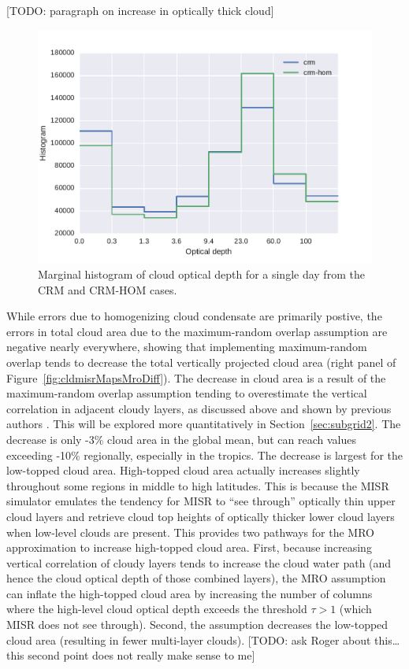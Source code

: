 {[}TODO: paragraph on increase in optically thick cloud{]}

\begin{figure}[htbp]
\centering
\includegraphics{graphics/subgrid1_taudist.pdf}
\caption{\label{fig:subgrid1_taudist}Marginal histogram of cloud optical
depth for a single day from the CRM and CRM-HOM
cases.}\label{fig:subgrid1ux5ftaudist}
\end{figure}

While errors due to homogenizing cloud condensate are primarily postive,
the errors in total cloud area due to the maximum-random overlap
assumption are negative nearly everywhere, showing that implementing
maximum-random overlap tends to decrease the total vertically projected
cloud area (right panel of Figure~\ref{fig:cldmisrMapsMroDiff}). The
decrease in cloud area is a result of the maximum-random overlap
assumption tending to overestimate the vertical correlation in adjacent
cloudy layers, as discussed above and shown by previous authors
\citep{mace_and_benson-troth_2002, hogan_and_illingworth_2000, barker_2008}.
This will be explored more quantitatively in Section~\ref{sec:subgrid2}.
The decrease is only -3\% cloud area in the global mean, but can reach
values exceeding -10\% regionally, especially in the tropics. The
decrease is largest for the low-topped cloud area. High-topped cloud
area actually increases slightly throughout some regions in middle to
high latitudes. This is because the MISR simulator emulates the tendency
for MISR to ``see through'' optically thin upper cloud layers and
retrieve cloud top heights of optically thicker lower cloud layers when
low-level clouds are present. This provides two pathways for the MRO
approximation to increase high-topped cloud area. First, because
increasing vertical correlation of cloudy layers tends to increase the
cloud water path (and hence the cloud optical depth of those combined
layers), the MRO assumption can inflate the high-topped cloud area by
increasing the number of columns where the high-level cloud optical
depth exceeds the threshold \(\tau > 1\) (which MISR does not see
through). Second, the assumption decreases the low-topped cloud area
(resulting in fewer multi-layer clouds). {[}TODO: ask Roger about
this\ldots{}this second point does not really make sense to me{]}


